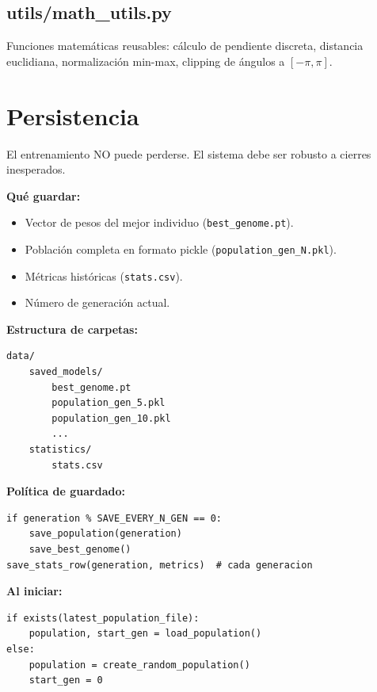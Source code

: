 \documentclass[11pt,a4paper]{article}
\begin{document}
\subsection{utils/math\_utils.py}

Funciones matemáticas reusables: cálculo de pendiente discreta, distancia euclidiana, normalización min-max, clipping de ángulos a $[-\pi, \pi]$.

\section{Persistencia}

El entrenamiento NO puede perderse. El sistema debe ser robusto a cierres inesperados.

\textbf{Qué guardar:}
\begin{itemize}
    \item Vector de pesos del mejor individuo (\texttt{best\_genome.pt}).
    \item Población completa en formato pickle (\texttt{population\_gen\_N.pkl}).
    \item Métricas históricas (\texttt{stats.csv}).
    \item Número de generación actual.
\end{itemize}

\textbf{Estructura de carpetas:}

\begin{lstlisting}[language=bash]
data/
    saved_models/
        best_genome.pt
        population_gen_5.pkl
        population_gen_10.pkl
        ...
    statistics/
        stats.csv
\end{lstlisting}

\textbf{Política de guardado:}

\begin{lstlisting}
if generation % SAVE_EVERY_N_GEN == 0:
    save_population(generation)
    save_best_genome()
save_stats_row(generation, metrics)  # cada generacion
\end{lstlisting}

\textbf{Al iniciar:}

\begin{lstlisting}
if exists(latest_population_file):
    population, start_gen = load_population()
else:
    population = create_random_population()
    start_gen = 0
\end{lstlisting}
\end{document}
